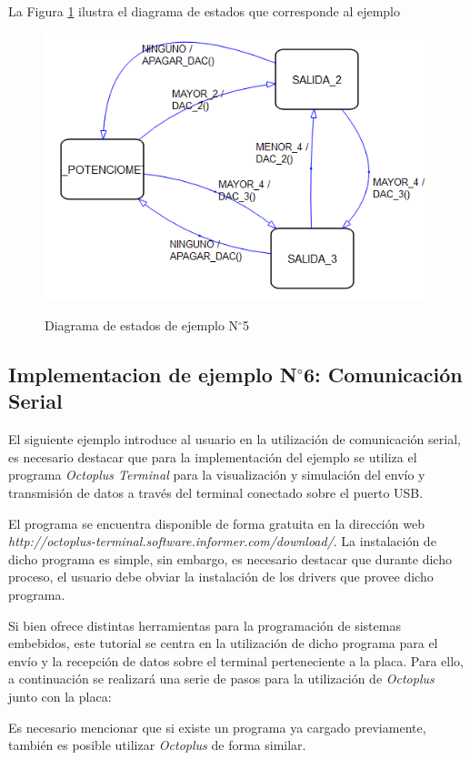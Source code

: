 \documentclass[12pt,letterpaper]{article}
\begin{document}
\begin{enumerate}
La Figura \ref{Fig28} ilustra el diagrama de estados que corresponde al ejemplo

\begin{center}
\begin{figure}[!h]
\centering
\includegraphics[width=6 cm]{figuras/f10.png}\\
\caption{Diagrama de estados de ejemplo N$^{\circ}$5}
\label{Fig28}
\end{figure}
\end{center}


\end{enumerate}




\subsection{Implementacion de ejemplo N$^{\circ}$6: Comunicación Serial}\label{sec:serial}
El siguiente ejemplo introduce al usuario en la utilización de comunicación serial, es necesario destacar que para la implementación del ejemplo se utiliza el programa \textit{Octoplus Terminal} para la visualización y simulación del envío y transmisión de datos a través del terminal conectado sobre el puerto USB.

El programa se encuentra disponible de forma gratuita en la dirección web \textit{http://octoplus-terminal.software.informer.com/download/}. La instalación de dicho programa es simple, sin embargo, es necesario destacar que durante dicho proceso, el usuario debe obviar la instalación de los drivers que provee dicho programa.

Si bien ofrece distintas herramientas para la programación de sistemas embebidos, este tutorial se centra en la utilización de dicho programa para el envío y la recepción de datos sobre el terminal perteneciente a la placa. Para ello, a continuación se realizará una serie de pasos para la utilización de \textit{Octoplus} junto con la placa:

Es necesario mencionar que si existe un programa ya cargado previamente, también es posible utilizar \textit{Octoplus} de forma similar.
\end{document}
